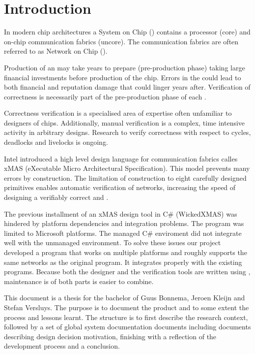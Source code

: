 \chapter*{Introduction}

In modern chip architectures a System on Chip (\Soc) contains a processor (core) and 
on-chip communication fabrics (uncore). The communication fabrics are often referred 
to as Network on Chip (\Noc).

Production of an \Noc may take years to prepare (pre-production phase) taking large financial investments
before production of the chip. Errors in the \Noc could lead to both financial and reputation 
damage that could linger years after. Verification of correctness is necessarily part of the 
pre-production phase of each \Noc.

Correctness verification is a specialised area of expertise often unfamiliar to designers of chips.
Additionally, manual verification is a complex, time intensive activity in arbitrary designs.
Research to verify correctness with respect to cycles, deadlocks and livelocks is ongoing. 

Intel introduced a high level design language for communication fabrics calles xMAS (eXecutable 
Micro Architectural Specification). This model prevents many errors by 
construction\cite{DBLP:journals/dt/ChatterjeeKO12}. The limitation of construction to eight 
carefully designed primitives enables automatic verification of networks, increasing the 
speed of designing a verifiably correct \Noc and \Soc.

The previous installment of an xMAS design tool in C\# (WickedXMAS) was hindered by platform 
dependencies and \cpp integration problems. The program was limited to Microsoft platforms. The
managed C\# enviroment did not integrate well with the unmanaged \cpp environment.
To solve these issues our project developed a program that works on multiple platforms and 
roughly supports the same networks as the original program. It integrates properly with the existing \cpp 
programs. Because both the \xmas designer and the verification tools are written 
using \cpp, maintenance is of both parts is easier to combine.

This document is a thesis for the bachelor of Guus Bonnema, Jeroen Kleijn and Stefan Versluys.
The purpose is to document the product and to some extent the process and lessons learnt.
The structure is to first describe the research context, followed by a set of global system 
documentation documents including documents describing design decision motivation, finishing
with a reflection of the development process and a conclusion.

